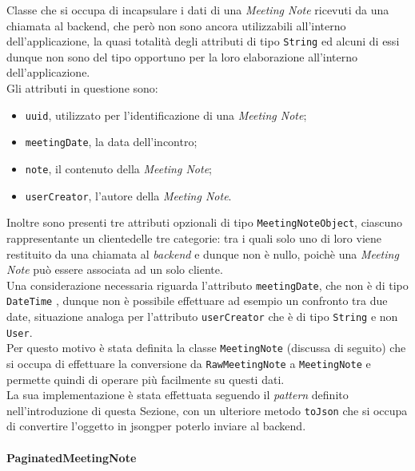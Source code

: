 \noindent Classe che si occupa di incapsulare i dati di una \emph{Meeting Note} ricevuti da una chiamata al \gls{backend}\glsoccur, che però non sono ancora utilizzabili all'interno dell'applicazione, la quasi totalità degli attributi di tipo \lstinline{String} ed alcuni di essi dunque non sono del tipo opportuno per la loro elaborazione all'interno dell'applicazione.\\
Gli attributi in questione sono:
\begin{itemize}
    \item \lstinline{uuid}, utilizzato per l'identificazione di una \emph{Meeting Note};
    \item \lstinline{meetingDate}, la data dell'incontro;
    \item \lstinline{note}, il contenuto della \emph{Meeting Note};
    \item \lstinline{userCreator}, l'autore della \emph{Meeting Note}.
\end{itemize}
Inoltre sono presenti tre attributi opzionali di tipo \lstinline{MeetingNoteObject}, ciascuno rappresentante un \gls{cliente}\glsoccur delle tre categorie: tra i quali solo uno di loro viene restituito da una chiamata al \emph{backend} e dunque non è nullo, poichè una \emph{Meeting Note} può essere associata ad un solo \gls{cliente}\glsoccur.\\
Una considerazione necessaria riguarda l'attributo \lstinline{meetingDate}, che non è di tipo \lstinline{DateTime} \cite{site:date-time}, dunque non è possibile effettuare ad esempio un confronto tra due date, situazione analoga per l'attributo \lstinline{userCreator} che è di tipo \lstinline{String} e non \lstinline{User}.\\
Per questo motivo è stata definita la classe \lstinline{MeetingNote} (discussa di seguito) che si occupa di effettuare la conversione da \lstinline{RawMeetingNote} a \lstinline{MeetingNote} e permette quindi di operare più facilmente su questi dati. \\
La sua implementazione è stata effettuata seguendo il \emph{pattern} definito nell'introduzione di questa Sezione, con un ulteriore metodo \lstinline{toJson} che si occupa di convertire l'oggetto in \gls{jsong}\glsoccur per poterlo inviare al \gls{backend}\glsoccur.

\paragraph*{PaginatedMeetingNote} ~ \\
\label{par:paginated-meeting-note}

